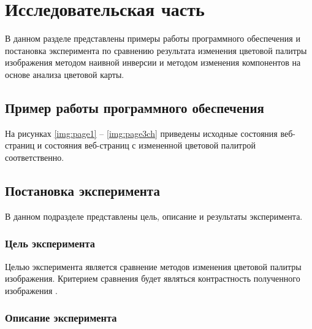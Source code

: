 \chapter{Исследовательская часть}

В данном разделе представлены примеры работы программного обеспечения и постановка эксперимента по сравнению результата изменения цветовой палитры изображения методом наивной инверсии и методом изменения компонентов на основе анализа цветовой карты.

\section{Пример работы программного обеспечения}

На рисунках \ref{img:page1} -- \ref{img:page3ch} приведены исходные состояния веб-страниц и состояния веб-страниц с измененной цветовой палитрой соответственно.

\clearpage







\section{Постановка эксперимента}

В данном подразделе представлены цель, описание и результаты эксперимента.

\subsection{Цель эксперимента}

Целью эксперимента является сравнение методов изменения цветовой палитры изображения. Критерием сравнения будет являться контрастность полученного изображения \cite{wcag1}.

\subsection{Описание эксперимента}

